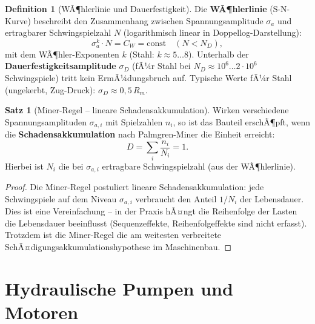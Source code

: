 ﻿\documentclass[a4paper,12pt]{report}
\theoremstyle{definition}
\newtheorem{definition}{Definition}
\newtheorem{satz}{Satz}
\begin{document}
\begin{definition}[WÃ¶hlerlinie und Dauerfestigkeit]
Die \textbf{WÃ¶hlerlinie} (S-N-Kurve) beschreibt den Zusammenhang zwischen
Spannungsamplitude $\sigma_a$ und ertragbarer Schwingspielzahl $N$
(logarithmisch linear in Doppellog-Darstellung):
\[
  \sigma_a^k \cdot N = C_W = \mathrm{const} \quad (N < N_D),
\]
mit dem WÃ¶hler-Exponenten $k$ (Stahl: $k \approx 5\ldots8$).
Unterhalb der \textbf{Dauerfestigkeitsamplitude} $\sigma_D$ (fÃ¼r Stahl
bei $N_D \approx 10^6\ldots2\cdot10^6$ Schwingspiele) tritt kein ErmÃ¼dungsbruch auf.
Typische Werte fÃ¼r Stahl (ungekerbt, Zug-Druck): $\sigma_D \approx 0{,}5\,R_m$.
\end{definition}

\begin{satz}[Miner-Regel -- lineare Schadensakkumulation]
Wirken verschiedene Spannungsamplituden $\sigma_{a,i}$ mit Spielzahlen $n_i$,
so ist das Bauteil erschÃ¶pft, wenn die \textbf{Schadensakkumulation}
nach Palmgren-Miner die Einheit erreicht:
\[
  D = \sum_{i}\frac{n_i}{N_{i}} = 1.
\]
Hierbei ist $N_i$ die bei $\sigma_{a,i}$ ertragbare Schwingspielzahl
(aus der WÃ¶hlerlinie).
\end{satz}
\begin{proof}
Die Miner-Regel postuliert lineare Schadensakkumulation: jede Schwingspiele
auf dem Niveau $\sigma_{a,i}$ verbraucht den Anteil $1/N_i$ der Lebensdauer.
Dies ist eine Vereinfachung -- in der Praxis hÃ¤ngt die Reihenfolge der Lasten
die Lebensdauer beeinflusst (Sequenzeffekte, Reihenfolgeffekte sind nicht erfasst).
Trotzdem ist die Miner-Regel die am weitesten verbreitete
SchÃ¤digungsakkumulationshypothese im Maschinenbau.
\end{proof}


\section{Hydraulische Pumpen und Motoren}
\end{document}
